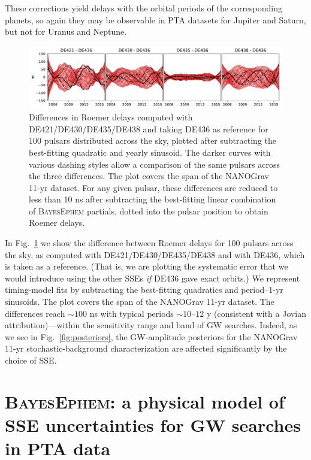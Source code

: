 \documentclass[iop,apj,twocolappendix]{emulateapj}
\begin{document}
These corrections yield delays with the orbital periods of the corresponding planets, so again they may be observable in PTA datasets for Jupiter and Saturn, but not for Uranus and Neptune.
%
\begin{figure}[t]
    \centering
    \includegraphics[width=2\columnwidth]{figures/roemerdiff.pdf}
    \caption{Differences in Roemer delays computed with DE421/DE430/DE435/DE438 and taking DE436 as reference for 100 pulsars distributed across the sky, plotted after subtracting the best-fitting quadratic and yearly sinusoid. The darker curves with various dashing styles allow a comparison of the same pulsars across the three differences. The plot covers the span of the NANOGrav 11-yr dataset.
    For any given pulsar, these differences are reduced to less than 10 ns after subtracting the best-fitting linear combination of \textsc{BayesEphem} partials, dotted into the pulsar position to obtain Roemer delays.
    }
    \label{fig:roemer}
\end{figure}

In Fig.\ \ref{fig:roemer} we show the difference between Roemer delays for 100 pulsars across the sky, as computed with DE421/DE430/DE435/DE438 and with DE436, which is taken as a reference. (That is, we are plotting the systematic error that we would introduce using the other SSEs \emph{if} DE436 gave exact orbits.) We represent timing-model fits by subtracting the best-fitting quadratics and period--1-yr sinusoids. The plot covers the span of the NANOGrav 11-yr dataset.
The differences reach $\sim 100$ ns with typical periods $\sim 10$--$12$ y (consistent with a Jovian attribution)---within the sensitivity range and band of GW searches. Indeed, as we see in Fig.\ \ref{fig:posteriors}, the GW-amplitude posteriors for the NANOGrav 11-yr stochastic-background characterization are affected significantly by the choice of SSE.

\section{\textsc{BayesEphem}: a physical model of SSE uncertainties for GW searches in PTA data}
\label{sec:physical}
\end{document}
